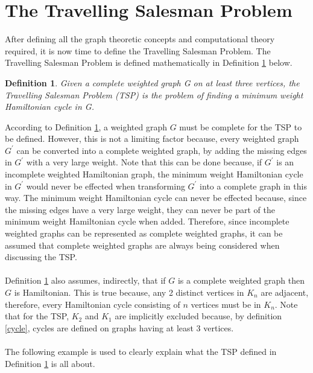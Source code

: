 \documentclass{article}
\newtheorem{definition}{Definition}[subsection]
\begin{document}
\section{The Travelling Salesman Problem}
After defining all the graph theoretic concepts and computational theory required, it is now time to define the Travelling Salesman Problem. The Travelling Salesman Problem is defined mathematically in Definition \ref{TSP} below.
\begin{definition}
\label{TSP}
Given a complete weighted graph G on at least three vertices, the Travelling Salesman Problem (TSP) is the problem of finding a minimum weight Hamiltonian cycle in G. {}
\end{definition}
According to Definition \ref{TSP}, a weighted graph $\mathit{G}$ must be complete for the TSP to be defined. However, this is not a limiting factor because, every weighted graph $\mathit{G^\prime}$ can be converted into a complete weighted graph, by adding the missing edges in $\mathit{G^\prime}$ with a very large weight. Note that this can be done because, if $\mathit{G^\prime}$ is an incomplete weighted Hamiltonian graph, the minimum weight Hamiltonian cycle in $\mathit{G^\prime}$ would never be effected when transforming $\mathit{G^\prime}$ into a complete graph in this way. The minimum weight Hamiltonian cycle can never be effected because, since the missing edges have a very large weight, they can never be part of the minimum weight Hamiltonian cycle when added. Therefore, since incomplete weighted graphs can be represented as complete weighted graphs, it can be assumed that complete weighted graphs are always being considered when discussing the TSP.\\\\
Definition \ref{TSP} also assumes, indirectly, that if $\mathit{G}$ is a complete weighted graph then $\mathit{G}$ is Hamiltonian. This is true because, any 2 distinct vertices in $K_n$ are adjacent, therefore, every Hamiltonian cycle consisting of $n$ vertices must be in $K_n$. Note that for the TSP, $K_2$ and $K_1$ are implicitly excluded because, by definition \ref{cycle}, cycles are defined on graphs having at least 3 vertices.\\ 
\\
The following example is used to clearly explain what the TSP defined in Definition \ref{TSP} is all about.
\end{document}
